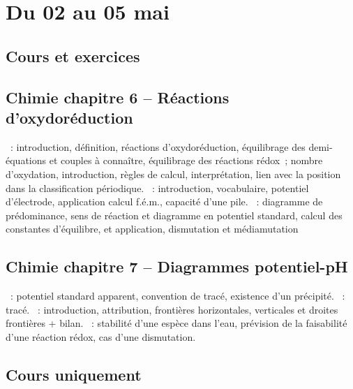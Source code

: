 \documentclass[a4paper, 10pt, final, garamond]{book}
\begin{document}
\setcounter{chapter}{24}

\chapter{Du 02 au 05 mai}

\section{Cours et exercices}
\section*{Chimie chapitre 6 -- Réactions d'oxydoréduction}
\begin{enumerate}[label=\Roman*]
    ~: introduction, définition, réactions
        d'oxydoréduction, équilibrage des demi-équations et couples à connaître,
        équilibrage des réactions rédox~; nombre d'oxydation, introduction,
        règles de calcul, interprétation, lien avec la position dans la
        classification périodique.
    ~: introduction, vocabulaire, potentiel d'électrode, application
        calcul f.é.m., capacité d'une pile.
    ~: diagramme de prédominance, sens de
        réaction et diagramme en potentiel standard, calcul des constantes
        d'équilibre, et application, dismutation et médiamutation
\end{enumerate}

\section*{Chimie chapitre 7 -- Diagrammes potentiel-pH}
\begin{enumerate}[label=\Roman*]
    ~: potentiel standard apparent,
    convention de tracé, existence d'un précipité.
    ~: tracé.
    ~: introduction, attribution, frontières
    horizontales, verticales et droites frontières + bilan.
    ~: stabilité d'une espèce dans
      l'eau, prévision de la faisabilité d'une réaction rédox, cas d'une
      dismutation.
\end{enumerate}

\section{Cours uniquement}
\end{document}
